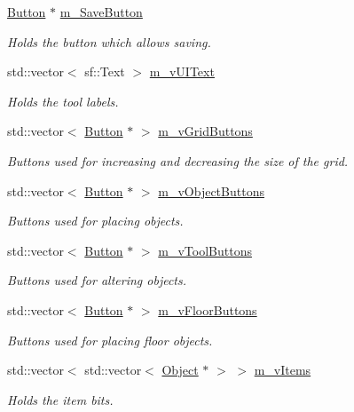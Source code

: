 \begin{DoxyCompactItemize}
\hyperlink{class_button}{Button} $\ast$ \hyperlink{class_editor_ab877f2e654748bb1fcc5b4208ca14d94}{m\+\_\+\+Save\+Button}
\begin{DoxyCompactList}\small\item\em Holds the button which allows saving. \end{DoxyCompactList}\item 
std\+::vector$<$ sf\+::\+Text $>$ \hyperlink{class_editor_a1b4196b5bad3786be4ed7da118722259}{m\+\_\+v\+U\+I\+Text}
\begin{DoxyCompactList}\small\item\em Holds the tool labels. \end{DoxyCompactList}\item 
std\+::vector$<$ \hyperlink{class_button}{Button} $\ast$ $>$ \hyperlink{class_editor_ac0d079d35dfb8f4e4c1541ace24e7950}{m\+\_\+v\+Grid\+Buttons}
\begin{DoxyCompactList}\small\item\em Buttons used for increasing and decreasing the size of the grid. \end{DoxyCompactList}\item 
std\+::vector$<$ \hyperlink{class_button}{Button} $\ast$ $>$ \hyperlink{class_editor_a40263baeadc15383c2fddcf82d27d627}{m\+\_\+v\+Object\+Buttons}
\begin{DoxyCompactList}\small\item\em Buttons used for placing objects. \end{DoxyCompactList}\item 
std\+::vector$<$ \hyperlink{class_button}{Button} $\ast$ $>$ \hyperlink{class_editor_a8e2d7507b50865088107e432c39b6a89}{m\+\_\+v\+Tool\+Buttons}
\begin{DoxyCompactList}\small\item\em Buttons used for altering objects. \end{DoxyCompactList}\item 
std\+::vector$<$ \hyperlink{class_button}{Button} $\ast$ $>$ \hyperlink{class_editor_a948e20d3f6fb1c3036087e88dddaf69a}{m\+\_\+v\+Floor\+Buttons}
\begin{DoxyCompactList}\small\item\em Buttons used for placing floor objects. \end{DoxyCompactList}\item 
std\+::vector$<$ std\+::vector$<$ \hyperlink{class_object}{Object} $\ast$ $>$ $>$ \hyperlink{class_editor_a09f6db89db3bb550d9f2a1ae2338fb66}{m\+\_\+v\+Items}
\begin{DoxyCompactList}\small\item\em Holds the item bits. \end{DoxyCompactList}\item 

\end{DoxyCompactItemize}
